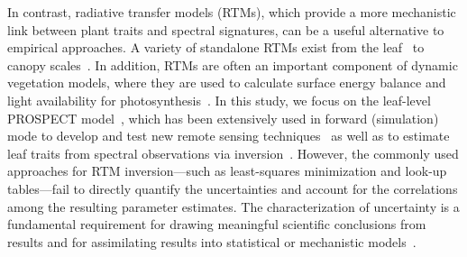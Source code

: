 In contrast, radiative transfer models (RTMs), which provide a more mechanistic link between plant traits and spectral signatures, can be a useful alternative to empirical approaches.
A variety of standalone RTMs exist from the leaf~\cite{dawson_1998_liberty,feret_2008_prospect,ganapol_1998} to canopy scales~\cite{jacquemoud_2009_prosail,kuusk_2001_journal,verhoef_1984_sail,wang_2013_canopy}.
In addition, RTMs are often an important component of dynamic vegetation models, where they are used to calculate surface energy balance and light availability for photosynthesis~\cite{medvigy_2009_mechanistic,nimeister_2010_clumped,kobayashi_2012_modeling}.
In this study, we focus on the leaf-level PROSPECT model~\cite{jacquemoud_1990_prospect,feret_2008_prospect}, which has been extensively used in forward (simulation) mode to develop and test new remote sensing techniques~\cite{croft_2014_applicability,feret_2011_optimizing,lemaire_2004_towards,zarco_tejada_2013_estimating}
as well as to estimate leaf traits from spectral observations via inversion~\cite{atzberger_2012_spatially,feret_2008_prospect,jacquemoud_1995_extraction,jacquemoud_2009_prosail,li_2013_retrieval,li_2011_retrieval,zarco_tejada_2004_needle}.
However, the commonly used approaches for RTM inversion—such as least-squares minimization and look-up tables—fail to directly quantify the uncertainties and account for the correlations among the resulting parameter estimates.
The characterization of uncertainty is a fundamental requirement for drawing meaningful scientific conclusions from results and for assimilating results into statistical or mechanistic models~\cite{cressie_accounting_2009,quaife_2008_assimilating}.

